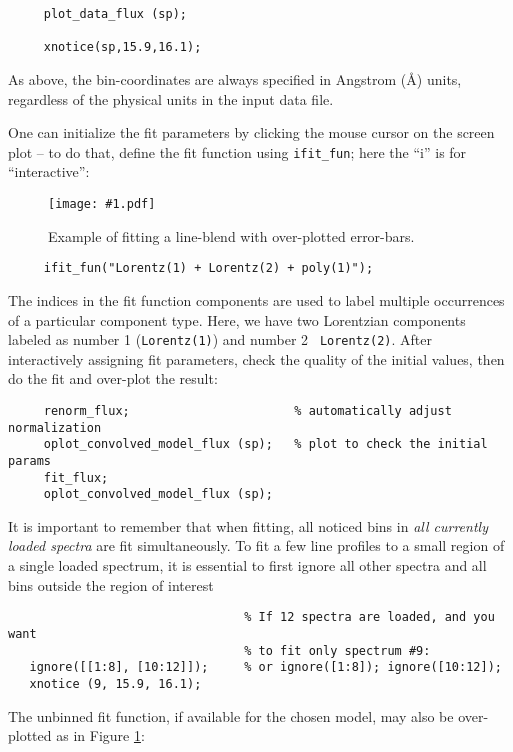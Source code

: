 \documentclass{book}
\newcommand{\putfig}[1]{\texttt{[image: \#1.pdf]}}
\newcommand{\putfig}[1]{\psfig{file=#1.ps}}
\begin{document}
\begin{enumerate}
\begin{verbatim}
     plot_data_flux (sp);

     xnotice(sp,15.9,16.1);
     \end{verbatim}

As above, the bin-coordinates are always specified in Angstrom (\AA)
units, regardless of the physical units in the input data file.

One can initialize the fit parameters by clicking the mouse cursor on the
screen plot -- to do that, define the fit function using {\tt ifit\_fun};
here the ``i'' is for ``interactive'':

\begin{figure}[ht]
\putfig{figures/profile_fit}
\caption{Example of fitting a line-blend with over-plotted error-bars.}
\label{fig:profile_fit}
\end{figure}

\begin{verbatim}
     ifit_fun("Lorentz(1) + Lorentz(2) + poly(1)");
     \end{verbatim}

The indices in the fit function components are used to label multiple
occurrences of a particular component type.  Here, we have two Lorentzian
components labeled as number 1 ({\tt Lorentz(1)}) and number 2 {\tt
Lorentz(2)}.  After interactively assigning fit parameters, check the
quality of the initial values, then do the fit and over-plot the result:

     \begin{verbatim}
     renorm_flux;                       % automatically adjust normalization
     oplot_convolved_model_flux (sp);   % plot to check the initial params
     fit_flux;
     oplot_convolved_model_flux (sp);
     \end{verbatim}

It is important to remember that when fitting, all noticed bins in {\it all
currently loaded spectra} are fit simultaneously. To fit a few line profiles
to a small region of a single loaded spectrum, it is essential to first
ignore all other spectra and all bins outside the region of interest
\begin{verbatim}
                                 % If 12 spectra are loaded, and you want
                                 % to fit only spectrum #9:
   ignore([[1:8], [10:12]]);     % or ignore([1:8]); ignore([10:12]);
   xnotice (9, 15.9, 16.1);
\end{verbatim}

The unbinned fit function, if available for the
chosen model, may also be over-plotted as in Figure \ref{fig:profile_fit}:


\end{enumerate}
\end{document}
